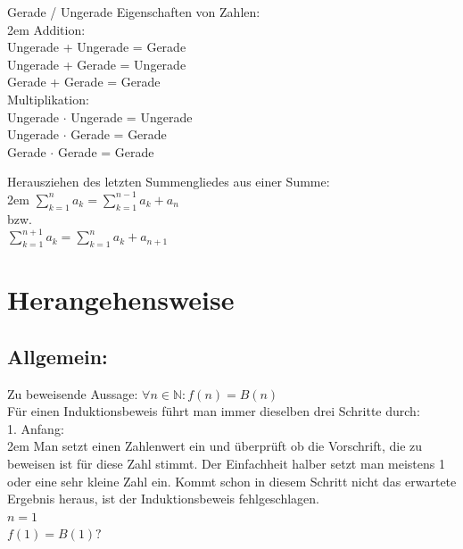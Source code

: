 \documentclass[11pt,final]{scrreprt}
\newcommand{\br} {\medskip\\}
\newcommand{\N} {\mathbb N}
\begin{document}
Gerade / Ungerade Eigenschaften von Zahlen:\\

\begingroup
\leftskip2em 
Addition:\\
Ungerade + Ungerade = Gerade\\
Ungerade + Gerade = Ungerade\\
Gerade + Gerade = Gerade\br
Multiplikation:\\
Ungerade $\cdot$ Ungerade = Ungerade\\
Ungerade $\cdot$ Gerade = Gerade\\
Gerade $\cdot$ Gerade = Gerade\\
\par	
\endgroup 

Herausziehen des letzten Summengliedes aus einer Summe:\\

\begingroup
\leftskip2em 
$ \sum\limits_{k=1}^{n} a_{k} = \sum\limits_{k=1}^{n-1} a_{k} + a_{n} $\smallskip\\
bzw.\smallskip\\
$ \sum\limits_{k=1}^{n+1} a_{k} = \sum\limits_{k=1}^{n} a_{k} + a_{n+1} $\\
\par	
\endgroup 

\section{Herangehensweise}

\subsection*{Allgemein:}
	
Zu beweisende Aussage: $ \forall n \in \N: f(n) = B(n) $\\		
Für einen Induktionsbeweis führt man immer dieselben drei Schritte durch:\br
		
1. Anfang:\\	
		
\begingroup
\leftskip2em 
Man setzt einen Zahlenwert ein und überprüft ob die Vorschrift, die zu beweisen ist für diese Zahl stimmt. Der Einfachheit halber setzt man meistens 1 oder eine sehr kleine Zahl ein. Kommt schon in diesem Schritt nicht das erwartete Ergebnis heraus, ist der Induktionsbeweis fehlgeschlagen.\br		
$ n=1 $\\
$ f(1) = B(1) ? $\\
\par	
\endgroup 		
		
\end{document}
